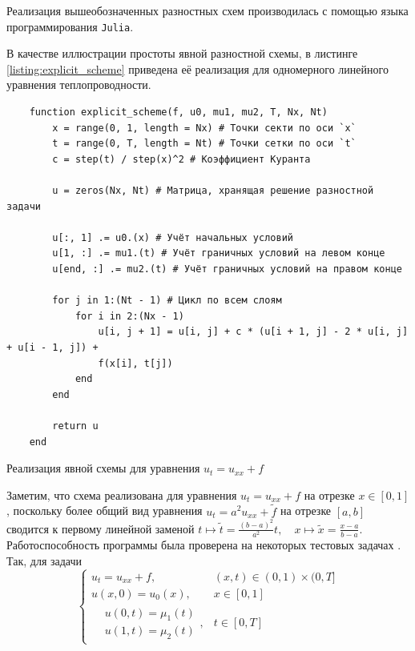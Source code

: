 
Реализация вышеобозначенных разностных схем производилась с помощью языка программирования \texttt{Julia}\cite{bezanson2017julia}. 

В качестве иллюстрации простоты явной разностной схемы, в листинге \ref{listing:explicit_scheme} приведена её реализация для одномерного линейного уравнения теплопроводности.
\begin{listing}
    \begin{verbatim}
    function explicit_scheme(f, u0, mu1, mu2, T, Nx, Nt)
        x = range(0, 1, length = Nx) # Точки секти по оси `x`
        t = range(0, T, length = Nt) # Точки сетки по оси `t`
        c = step(t) / step(x)^2 # Коэффициент Куранта
    
        u = zeros(Nx, Nt) # Матрица, хранящая решение разностной задачи
    
        u[:, 1] .= u0.(x) # Учёт начальных условий
        u[1, :] .= mu1.(t) # Учёт граничных условий на левом конце
        u[end, :] .= mu2.(t) # Учёт граничных условий на правом конце
    
        for j in 1:(Nt - 1) # Цикл по всем слоям
            for i in 2:(Nx - 1)
                u[i, j + 1] = u[i, j] + c * (u[i + 1, j] - 2 * u[i, j] + u[i - 1, j]) + 
                f(x[i], t[j])
            end
        end
    
        return u
    end
    \end{verbatim}
    \caption{Реализация явной схемы для уравнения $u_t = u_{xx} + f$}
    \label{listing:explicit_scheme}
\end{listing}
Заметим, что схема реализована для уравнения $u_t = u_{xx} + f$ на отрезке $x \in [0, 1]$, поскольку более общий вид уравнения $u_t = a^2 u_{xx} + \tilde{f}$ на отрезке $[a, b]$ сводится к первому линейной заменой $ t \mapsto \tilde{t} = \frac{(b - a)^2}{a^2} t, \quad x \mapsto \tilde{x} = \frac{x - a}{b - a}$.
Работоспособность программы была проверена на некоторых тестовых задачах \cite{горюнов2015методы}.
Так, для задачи
\begin{equation}\label{eq:task_1}
    \begin{cases}
        u_t = u_{xx} + f, & (x, t) \in (0, 1) \times (0, T]\\
        u(x, 0) = u_0(x), & x \in [0, 1]\\
        \begin{aligned}
            & \textstyle u(0, t) = \mu_1(t)\\
            & \textstyle u(1, t) = \mu_2(t)
        \end{aligned}, & t \in [0, T]
    \end{cases}
\end{equation}

